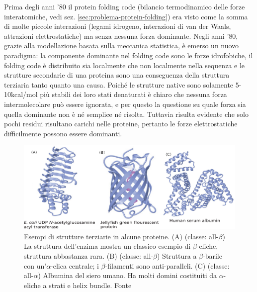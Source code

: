 {{\par Prima degli anni '80 il protein folding code (bilancio termodinamico delle forze interatomiche, vedi sez. \ref{sec:problema-protein-folding}) era visto come la somma di molte piccole interazioni (legami idrogeno, interazioni di van der Waals, attrazioni elettrostatiche) ma senza nessuna forza dominante\supercite{dill2008protein}. Negli anni '80, grazie alla modellazione basata sulla meccanica statistica, è emerso un nuovo paradigma: la componente dominante nel folding code sono le forze idrofobiche, il folding code è distribuito sia localmente che non localmente nella sequenza e le strutture secondarie di una proteina sono una conseguenza della struttura terziaria tanto quanto una causa. Poiché le strutture native sono solamente 5-10kcal/mol più stabili dei loro stati denaturati è chiaro che nessuna forza intermolecolare può essere ignorata, e per questo la questione su quale forza sia quella dominante non è né semplice né risolta. Tuttavia risulta evidente che solo pochi residui risultano carichi nelle proteine, pertanto le forze elettrostatiche difficilmente possono essere dominanti. 

\begin{figure}[!htb]
	\centering
	\includegraphics[scale=0.6]{images/strutture-proteine-complesse.png}
	\caption{Esempi di strutture terziarie in alcune proteine. (A) (classe: all-$\beta$) La struttura dell'enzima mostra un classico esempio di $\beta$-eliche, struttura abbastanza rara. (B) (classe: all-$\beta$) Struttura a $\beta$-barile con un'$\alpha$-elica centrale; i $\beta$-filamenti sono anti-paralleli. (C) (classe: all-$\alpha$)  Albumina del siero umano. Ha molti domini costituiti da $\alpha$-eliche a strati e helix bundle. Fonte \cite{moran2012principles}}
	\label{fig:strutture-complesse}
\end{figure}

}
}
